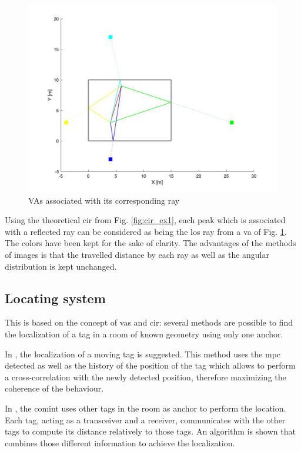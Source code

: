 \begin{figure}[H]
	\centering
	\includegraphics[width=.6\linewidth]{Images/va_map.jpg}
	\caption{VAs associated with its corresponding ray}
	\label{fig:va_room}
\end{figure}
 
Using the theoretical \gls{cir} from Fig. \ref{fig:cir_ex1}, each peak which is associated with a reflected ray can be considered as being the \gls{los} ray from a \gls{va} of Fig. \ref{fig:va_room}. The colors have been kept for the sake of clarity. The advantages of the methods of images is that the travelled distance by each ray as well as the angular distribution is kept unchanged.


\subsection{Locating system}
\label{loc_syst_mpc}

This is based on the concept of \glspl{va} and \gls{cir}: several methods are possible to find the localization of a tag in a room of known geometry using only one anchor.
\vspace{2mm}

In \cite{meissner2010mc}, the localization of a moving tag is suggested. This method uses the \gls{mpc} detected as well as the history of the position of the tag which allows to perform a cross-correlation with the newly detected position, therefore maximizing the coherence of the behaviour.
\vspace{2mm}

In \cite{froehle2013cooperative}, the \gls{comint} uses other tags in the room as anchor to perform the location. Each tag, acting as a transceiver and a receiver, communicates with the other tags to compute its distance relatively to those tags. An algorithm is shown that combines those different information to achieve the localization.
\vspace{2mm}

